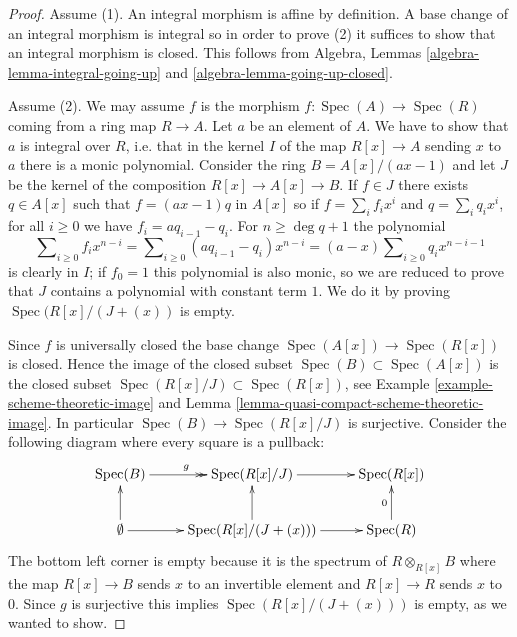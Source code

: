 \documentclass[10pt,a4paper]{amsart}
\theoremstyle{plain}
\theoremstyle{definition}
\theoremstyle{remark}
\numberwithin{equation}{subsection}
\def\Spec{\mathop{\mathrm{Spec}}}
\begin{document}
\begin{proof}
Assume (1). An integral morphism is affine by definition.
A base change of an integral morphism is integral so in order to prove (2)
it suffices to show that an integral morphism is closed.
This follows from Algebra, Lemmas \ref{algebra-lemma-integral-going-up}
and \ref{algebra-lemma-going-up-closed}.

\medskip\noindent
Assume (2). We may assume $f$ is the morphism
$f : \Spec(A) \to \Spec(R)$ coming from a ring map
$R \to A$. Let $a$ be an element of $A$. We have to show
that $a$ is integral over $R$, i.e. that in the kernel
$I$ of the map $R[x] \to A$ sending $x$ to $a$ there is
a monic polynomial. Consider the ring
$B = A[x]/(ax -1)$ and let $J$ be the kernel of the
composition $R[x]\to A[x] \to B$. If $f\in J$ there exists
$q\in A[x]$ such that $f = (ax-1)q$ in $A[x]$ so if
$f = \sum_i f_ix^i$ and $q = \sum_iq_ix^i$, for all $i \geq 0$
we have $f_i = aq_{i-1} - q_i$. For $n \geq \deg q + 1$ the polynomial
$$
\sum\nolimits_{i \geq 0} f_i x^{n - i} =
\sum\nolimits_{i \geq 0} (a q_{i - 1} - q_i) x^{n - i} =
(a - x) \sum\nolimits_{i \geq 0} q_i x^{n - i - 1}
$$
is clearly in $I$; if $f_0 = 1$ this polynomial is also monic, so we
are reduced to prove that $J$ contains a polynomial with constant term $1$.
We do it by proving $\Spec(R[x]/(J + (x))$ is empty.


\medskip\noindent
Since $f$ is universally closed the base change $\Spec(A[x]) \to \Spec(R[x])$
is closed. Hence the image of the closed subset $\Spec(B) \subset \Spec(A[x])$
is the closed subset $\Spec(R[x]/J) \subset \Spec(R[x])$, see
Example \ref{example-scheme-theoretic-image} and
Lemma \ref{lemma-quasi-compact-scheme-theoretic-image}.
In particular $\Spec(B) \to \Spec(R[x]/J)$ is surjective. Consider the
following diagram where every square is a pullback:
$$
\xymatrix{
\Spec(B) \ar@{->>}[r]^g &
\Spec(R[x]/J)  \ar[r] &
\Spec(R[x])\\
\emptyset \ar[u] \ar[r] &
\Spec(R[x]/(J + (x)))\ar[u] \ar[r] &
\Spec(R) \ar[u]^0
}
$$
The bottom left corner is empty because it is the spectrum of
$R\otimes_{R[x]} B$ where the map $R[x]\to B$ sends $x$ to an
invertible element and $R[x]\to R$ sends $x$ to $0$. Since $g$
is surjective this implies $\Spec(R[x]/(J + (x)))$ is empty, as
we wanted to show.
\end{proof}
\end{document}
